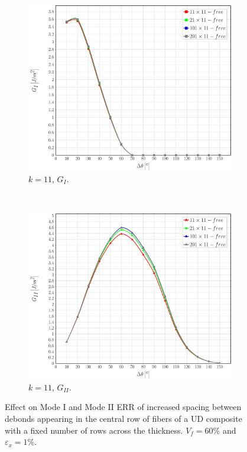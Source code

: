 \documentclass[review]{elsarticle}
\begin{document}
\begin{figure}[!h]
    \begin{subfigure}[b]{0.475\textwidth}
        \includegraphics[width=\textwidth]{sideabovefibers-t11-vf60-GI.pdf}
        \caption{$k=11$, $G_{I}$.}\label{subfig:sideabovefiber60MIt11}
    \end{subfigure} ~
    \begin{subfigure}[b]{0.475\textwidth}
        \includegraphics[width=\textwidth]{sideabovefibers-t11-vf60-GII.pdf}
        \caption{$k=11$, $G_{II}$.}\label{subfig:sideabovefiber60MIIt11}
    \end{subfigure}

\caption{Effect on Mode I and Mode II ERR of increased spacing between debonds appearing in the central row of fibers of a UD composite with a fixed number of rows across the thickness. $V_{f}=60\%$ and $\varepsilon_{x}=1\%$.}\label{fig:sideabovefibersthickfixed}
\end{figure}
\end{document}
